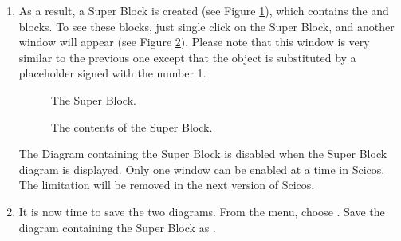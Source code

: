 \begin{enumerate}
\item
  As a result, a Super Block is created (see Figure \ref{fig:sb1}),
  which contains the  and  blocks. To see these
  blocks, just single click on the Super Block, and another window
  will appear (see Figure \ref{fig:sb2}). Please note that this window
  is very similar to the previous one except that the 
  object is substituted by a placeholder signed with the number 1.
%
\begin{figure}[htb]
\caption{The Super Block.}
\label{fig:sb1}
\end{figure}
%
\begin{figure}[htb]
\caption{The contents of the Super Block.}
\label{fig:sb2}
\end{figure}

\begin{note}
The Diagram containing the Super Block is disabled when the Super
Block diagram is displayed. Only one window can be enabled at a time
in Scicos. The limitation will be removed in the next version of
Scicos.
\end{note}

\item
  It is now time to save the two diagrams. From the 
  menu, choose . Save the
  diagram containing the Super Block as .

\end{enumerate}

